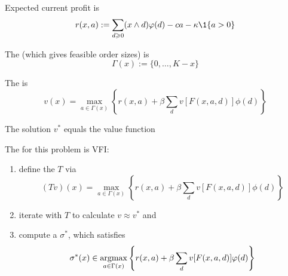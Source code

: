 \begin{frame}
    
    Expected current profit is
    \begin{equation*}
        r(x, a)  := \sum_{d \geq 0} (x \wedge d) \phi(d) 
            - c a - \kappa \1\{a > 0\}
    \end{equation*}

    \vspace{0.5em}
    \vspace{0.5em}
    The  (which gives feasible order sizes) is
    \begin{equation*}
        \Gamma(x) := \{0, \ldots, K - x\}
    \end{equation*}

    \vspace{0.5em}
    The  is
    \begin{equation*}
        v(x)
        = \max_{a \in \Gamma(x)} 
        \left\{
            r(x, a)
            + \beta
            \sum_d v[F(x, a, d)] \phi(d)
        \right\}
    \end{equation*}

    The solution $v^*$ equals the value function

\end{frame}

\begin{frame}
    
    The  for this problem is VFI:

    \vspace{0.5em}
    \vspace{0.5em}
    \begin{enumerate}
        \item define the  $T$ via
            \begin{equation*}
                (Tv)(x)
                = \max_{a \in \Gamma(x)} 
                \left\{
                    r(x, a)
                    + \beta
                    \sum_d v[F(x,a,d)] \phi(d)
                \right\}
            \end{equation*}
            \vspace{0.5em}
        \item iterate with $T$ to calculate $v \approx v^*$ and
            \vspace{0.5em}
            \vspace{0.5em}
            \vspace{0.5em}
        \item compute a  $\sigma^*$, which satisfies
            \begin{equation*}
                \sigma^*(x)
                \in \argmax_{a \in \Gamma(x)} 
                \left\{
                    r(x, a)
                    + \beta
                    \sum_d  v[F(x,a,d)] \phi(d)
                \right\}
            \end{equation*}
    \end{enumerate}

\end{frame}


